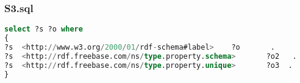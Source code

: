 \documentclass[titlepage, a4paper, 12pt] {article}
\begin{document}
\subsubsection{S3.sql}

\begin{lstlisting}[language=SQL]
select ?s ?o where
{
?s  <http://www.w3.org/2000/01/rdf-schema#label>    ?o       .
?s  <http://rdf.freebase.com/ns/type.property.schema>       ?o2   .
?s  <http://rdf.freebase.com/ns/type.property.unique>       ?o3  .
}
\end{lstlisting}




\end{document}

